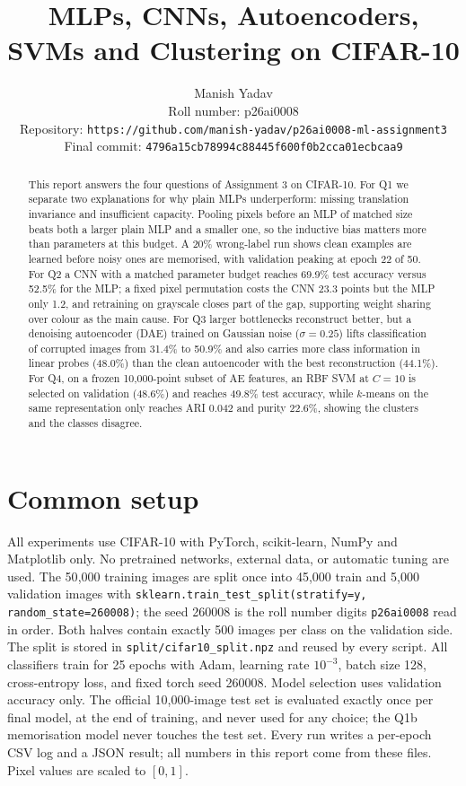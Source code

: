 \documentclass[10pt,twocolumn,letterpaper]{article}
\title{MLPs, CNNs, Autoencoders, SVMs and Clustering on CIFAR-10}
\author{Manish Yadav\\
Roll number: p26ai0008\\
Repository: \texttt{https://github.com/manish-yadav/p26ai0008-ml-assignment3}\\
Final commit: \texttt{4796a15cb78994c88445f600f0b2cca01ecbcaa9}
}
\begin{document}
\maketitle

\begin{abstract}
This report answers the four questions of Assignment 3 on CIFAR-10.
For Q1 we separate two explanations for why plain MLPs underperform: missing translation invariance and insufficient capacity.
Pooling pixels before an MLP of matched size beats both a larger plain MLP and a smaller one, so the inductive bias matters more than parameters at this budget.
A 20\% wrong-label run shows clean examples are learned before noisy ones are memorised, with validation peaking at epoch 22 of 50.
For Q2 a CNN with a matched parameter budget reaches 69.9\% test accuracy versus 52.5\% for the MLP; a fixed pixel permutation costs the CNN 23.3 points but the MLP only 1.2, and retraining on grayscale closes part of the gap, supporting weight sharing over colour as the main cause.
For Q3 larger bottlenecks reconstruct better, but a denoising autoencoder (DAE) trained on Gaussian noise ($\sigma{=}0.25$) lifts classification of corrupted images from 31.4\% to 50.9\% and also carries more class information in linear probes (48.0\%) than the clean autoencoder with the best reconstruction (44.1\%).
For Q4, on a frozen 10{,}000-point subset of AE features, an RBF SVM at $C{=}10$ is selected on validation (48.6\%) and reaches 49.8\% test accuracy, while $k$-means on the same representation only reaches ARI 0.042 and purity 22.6\%, showing the clusters and the classes disagree.
\end{abstract}

\section{Common setup}
All experiments use CIFAR-10 with PyTorch, scikit-learn, NumPy and Matplotlib only.
No pretrained networks, external data, or automatic tuning are used.
The 50{,}000 training images are split once into 45{,}000 train and 5{,}000 validation images with \texttt{sklearn.train\_test\_split(stratify=y, random\_state=260008)}; the seed 260008 is the roll number digits \texttt{p26ai0008} read in order.
Both halves contain exactly 500 images per class on the validation side.
The split is stored in \texttt{split/cifar10\_split.npz} and reused by every script.
All classifiers train for 25 epochs with Adam, learning rate $10^{-3}$, batch size 128, cross-entropy loss, and fixed torch seed 260008.
Model selection uses validation accuracy only.
The official 10{,}000-image test set is evaluated exactly once per final model, at the end of training, and never used for any choice; the Q1b memorisation model never touches the test set.
Every run writes a per-epoch CSV log and a JSON result; all numbers in this report come from these files.
Pixel values are scaled to $[0,1]$.
\end{document}
